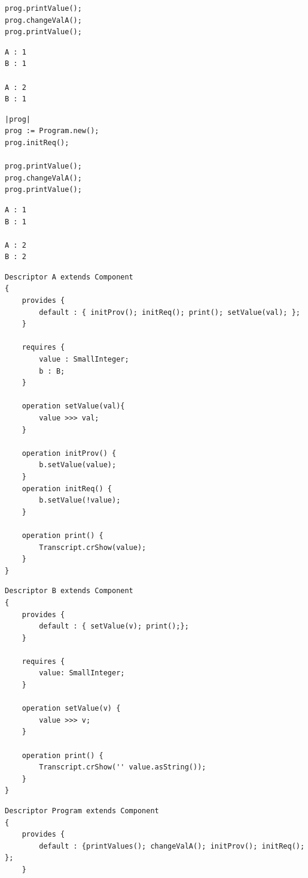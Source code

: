 \documentclass[11pt,a4paper,openany,oneside]{book}
\begin{document}
\begin{appendices}
\begin{lstlisting}[language=Compo, frame=single, caption=Workspace (Passage par Fournis)]
prog.printValue();
prog.changeValA();
prog.printValue();
\end{lstlisting}


\begin{lstlisting}[language=Compo, frame=single, caption=Output]
A : 1
B : 1

A : 2
B : 1
\end{lstlisting}

\begin{lstlisting}[language=Compo, frame=single, caption=Workspace (Passage par Requis)]
|prog|
prog := Program.new();
prog.initReq();

prog.printValue();
prog.changeValA();
prog.printValue();
\end{lstlisting}


\begin{lstlisting}[language=Compo, frame=single, caption=Output]
A : 1
B : 1

A : 2
B : 2
\end{lstlisting}

\newpage


\begin{lstlisting}[language=Compo, frame=single, caption=Composant A]
Descriptor A extends Component
{
	provides {
		default : { initProv(); initReq(); print(); setValue(val); };
	}
	
	requires {
		value : SmallInteger;
		b : B;
	}

	operation setValue(val){
	    value >>> val;												
	}
	
	operation initProv() {
		b.setValue(value);	
	}																								
	operation initReq() {
		b.setValue(!value);
	}
	
	operation print() {
		Transcript.crShow(value);
	}
}
\end{lstlisting}

\begin{lstlisting}[language=Compo, frame=single, caption=Composant B]
Descriptor B extends Component
{
	provides {
		default : { setValue(v); print();};
	} 
	
	requires {
		value: SmallInteger;
	}
	
	operation setValue(v) {
		value >>> v;
	}
	
	operation print() {
		Transcript.crShow('' value.asString());
	}
}
\end{lstlisting}

\newpage

\begin{lstlisting}[language=Compo, frame=single, caption=Programme]
Descriptor Program extends Component
{
	provides {
		default : {printValues(); changeValA(); initProv(); initReq(); };
	} 
	

\end{lstlisting}
\end{appendices}
\end{document}
